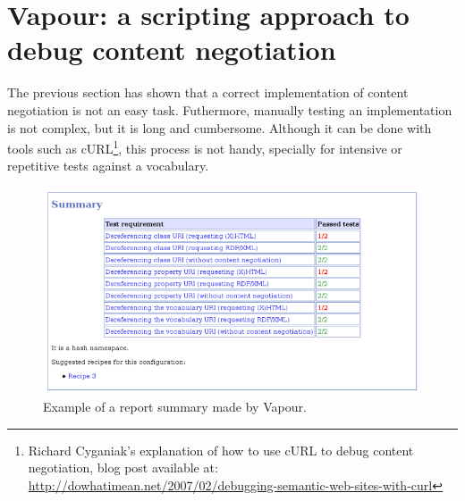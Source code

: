 \documentclass{../templates/llncs}
\begin{document}


\section{\label{sec:vapour}Vapour: a scripting approach to debug content negotiation}

The previous section has shown that a correct implementation of content negotiation 
is not an easy task. Futhermore, manually testing an implementation is not complex, but
it is long and cumbersome. Although it can be done with tools such as 
cURL\footnote{Richard Cyganiak's explanation of how to use cURL to debug content negotiation, 
blog post available at: \url{http://dowhatimean.net/2007/02/debugging-semantic-web-sites-with-curl}}, this process is not handy, specially for intensive or repetitive tests against a vocabulary.

\begin{figure}
 \centering
 \includegraphics[width=12cm]{images/report-summary.png}
 \caption{\label{fig:report-summary}Example of a report summary made by Vapour.}
\end{figure}
\end{document}
